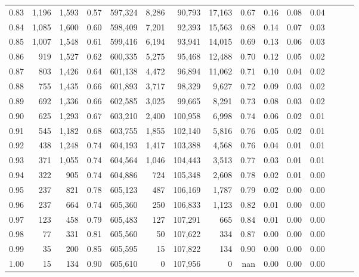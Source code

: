 \begin{tabular}{rrrrrrrrrrrrrrr}
0.83 &   1,196 &  1,593 &  0.57 &  597,324 &    8,286 &   90,793 &   17,163 &  0.67 &  0.16 &  0.08 &      0.04 \\
0.84 &   1,085 &  1,600 &  0.60 &  598,409 &    7,201 &   92,393 &   15,563 &  0.68 &  0.14 &  0.07 &      0.03 \\
0.85 &   1,007 &  1,548 &  0.61 &  599,416 &    6,194 &   93,941 &   14,015 &  0.69 &  0.13 &  0.06 &      0.03 \\
0.86 &     919 &  1,527 &  0.62 &  600,335 &    5,275 &   95,468 &   12,488 &  0.70 &  0.12 &  0.05 &      0.02 \\
0.87 &     803 &  1,426 &  0.64 &  601,138 &    4,472 &   96,894 &   11,062 &  0.71 &  0.10 &  0.04 &      0.02 \\
0.88 &     755 &  1,435 &  0.66 &  601,893 &    3,717 &   98,329 &    9,627 &  0.72 &  0.09 &  0.03 &      0.02 \\
0.89 &     692 &  1,336 &  0.66 &  602,585 &    3,025 &   99,665 &    8,291 &  0.73 &  0.08 &  0.03 &      0.02 \\
0.90 &     625 &  1,293 &  0.67 &  603,210 &    2,400 &  100,958 &    6,998 &  0.74 &  0.06 &  0.02 &      0.01 \\
0.91 &     545 &  1,182 &  0.68 &  603,755 &    1,855 &  102,140 &    5,816 &  0.76 &  0.05 &  0.02 &      0.01 \\
0.92 &     438 &  1,248 &  0.74 &  604,193 &    1,417 &  103,388 &    4,568 &  0.76 &  0.04 &  0.01 &      0.01 \\
0.93 &     371 &  1,055 &  0.74 &  604,564 &    1,046 &  104,443 &    3,513 &  0.77 &  0.03 &  0.01 &      0.01 \\
0.94 &     322 &    905 &  0.74 &  604,886 &      724 &  105,348 &    2,608 &  0.78 &  0.02 &  0.01 &      0.00 \\
0.95 &     237 &    821 &  0.78 &  605,123 &      487 &  106,169 &    1,787 &  0.79 &  0.02 &  0.00 &      0.00 \\
0.96 &     237 &    664 &  0.74 &  605,360 &      250 &  106,833 &    1,123 &  0.82 &  0.01 &  0.00 &      0.00 \\
0.97 &     123 &    458 &  0.79 &  605,483 &      127 &  107,291 &      665 &  0.84 &  0.01 &  0.00 &      0.00 \\
0.98 &      77 &    331 &  0.81 &  605,560 &       50 &  107,622 &      334 &  0.87 &  0.00 &  0.00 &      0.00 \\
0.99 &      35 &    200 &  0.85 &  605,595 &       15 &  107,822 &      134 &  0.90 &  0.00 &  0.00 &      0.00 \\
1.00 &      15 &    134 &  0.90 &  605,610 &        0 &  107,956 &        0 &   nan &  0.00 &  0.00 &      0.00 \\
\bottomrule
\end{tabular}
